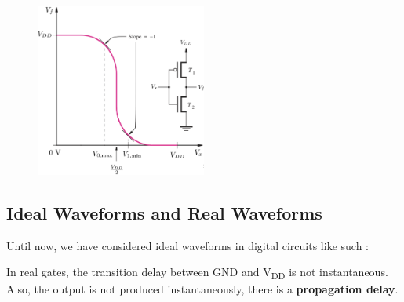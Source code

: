 \documentclass[12pt,openany]{book}
\begin{document}
			      	\begin{figure}[h]
			      		\centering
			      		\includegraphics[width=0.5\textwidth]{circuits/9.3.1.png} 
			      		\label{fig:voltage_transfer}
			      	\end{figure}
			      	
			      	\subsection{Ideal Waveforms and Real Waveforms}
			      	Until now, we have considered ideal waveforms in digital circuits like such :
			      	
			      	\begin{center}
			      		    
			      		
			      	\end{center}
			      	
			      	\newpage
			      	In real gates, the transition delay between GND and V\textsubscript{DD} is not instantaneous.
			      	Also, the output is not produced instantaneously, there is a \textbf{propagation delay}.
			      	
\end{document}
